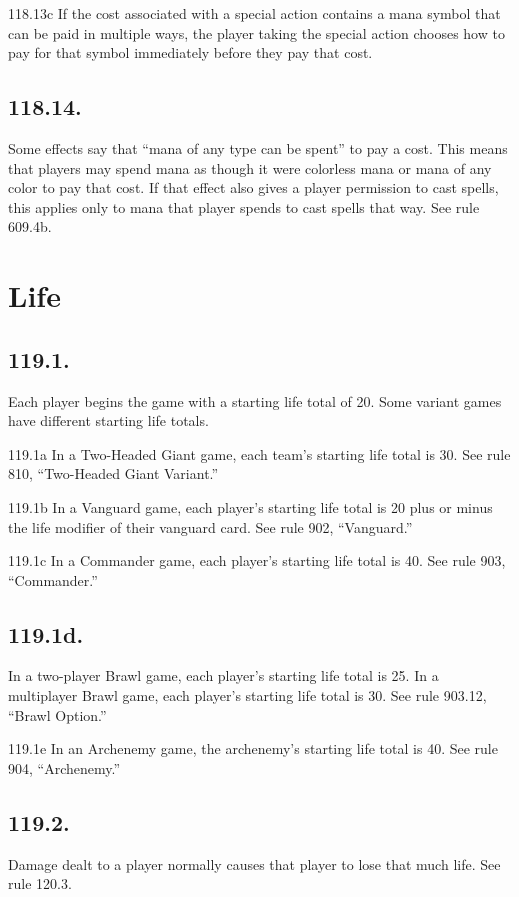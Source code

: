 118.13c If the cost associated with a special action contains a mana symbol that can be paid in multiple ways, the player taking the special action chooses how to pay for that symbol immediately before they pay that cost.

\subsection*{118.14.}
Some effects say that “mana of any type can be spent” to pay a cost. This means that players may spend mana as though it were colorless mana or mana of any color to pay that cost. If that effect also gives a player permission to cast spells, this applies only to mana that player spends to cast spells that way. See rule 609.4b.

\section{Life}
\subsection*{119.1.}
Each player begins the game with a starting life total of 20. Some variant games have different starting life totals.

119.1a In a Two-Headed Giant game, each team’s starting life total is 30. See rule 810, “Two-Headed Giant Variant.”

119.1b In a Vanguard game, each player’s starting life total is 20 plus or minus the life modifier of their vanguard card. See rule 902, “Vanguard.”

119.1c In a Commander game, each player’s starting life total is 40. See rule 903, “Commander.”

\subsection*{119.1d.}
In a two-player Brawl game, each player’s starting life total is 25. In a multiplayer Brawl game, each player’s starting life total is 30. See rule 903.12, “Brawl Option.”

119.1e In an Archenemy game, the archenemy’s starting life total is 40. See rule 904, “Archenemy.”

\subsection*{119.2.}
Damage dealt to a player normally causes that player to lose that much life. See rule 120.3.

